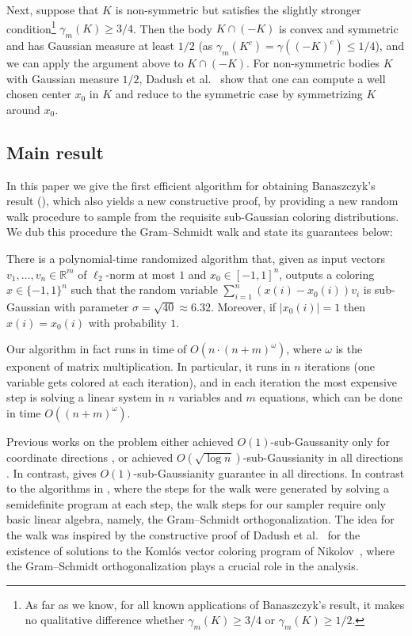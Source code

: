 \documentclass{toc}
\begin{document}
Next, suppose that $K$ is non-symmetric but satisfies the slightly stronger condition\footnote{As far as we know, for all known applications of Banaszczyk's result, it makes no qualitative difference whether $\gamma_m(K) \geq 3/4$ or $\gamma_m(K) \geq 1/2$.} $\gamma_m(K) \geq 3/4$. Then the body $K \cap (-K)$ is convex and symmetric and has Gaussian measure at least $1/2$ (as $\gamma_m(K^c) = \gamma(
(-K)^c) \leq 1/4$), and we can apply the argument above to $K \cap (-K)$.
For non-symmetric bodies $K$ with Gaussian measure $1/2$,
Dadush et al.~\cite{DGLN16} show that one can compute a well chosen center $x_0$ in $K$ and reduce to the symmetric case by symmetrizing $K$ around $x_0$.

\subsection{Main result}
In this paper we give the first efficient algorithm for obtaining Banaszczyk's
result (), which also yields a new constructive proof, by
providing a new random walk procedure to sample from the requisite sub-Gaussian
coloring distributions. We dub this procedure the Gram--Schmidt walk and
state its guarantees below:

\begin{theorem}
\label{thm:main}
There is a polynomial-time randomized algorithm that, given as input vectors $v_1,\dots,v_n\in\mathbb{R}^m$ of $\ell_2$-norm at most $1$ and $x_0\in [-1,1]^n$, outputs a coloring $x\in\{-1,1\}^n$ such that
the random variable $\sum_{i=1}^n (x(i)-x_0(i))v_i$ is sub-Gaussian with
parameter $\sigma = \sqrt{40} \approx 6.32$. Moreover, if $|x_0(i)|=1$ then $x(i) = x_0(i)$ with probability $1$.
\end{theorem}

Our algorithm in fact runs in time of $O(n \cdot (n+m)^{\omega})$, where
$\omega$ is the exponent of matrix multiplication.  In particular, it runs in
$n$ iterations (one variable gets colored at each iteration), and in each iteration
the most expensive step is solving a linear system in $n$ variables and $m$
equations, which can be done in time $O((n+m)^{\omega})$.

Previous works on the problem either
achieved $O(1)$-sub-Gaussanity only for coordinate directions \cite{BDG16,BG17},
or achieved
$O(\sqrt{\log n})$-sub-Gaussianity in all directions \cite{DGLN16}. In contrast,  gives $O(1)$-sub-Gaussianity guarantee in all directions.
In contrast to the algorithms in \cite{BDG16,BG17}, where the steps for the walk were generated by solving a semidefinite program at each step, the walk
steps for our sampler require only basic linear algebra, namely, the Gram--Schmidt orthogonalization.
The idea for the walk was inspired by the constructive
proof of Dadush et al.~\cite{DGLN16} for the existence of solutions to the Koml{\'o}s vector
coloring program of Nikolov~\cite{N13}, where the Gram--Schmidt orthogonalization
plays a crucial role in the analysis.
\end{document}

